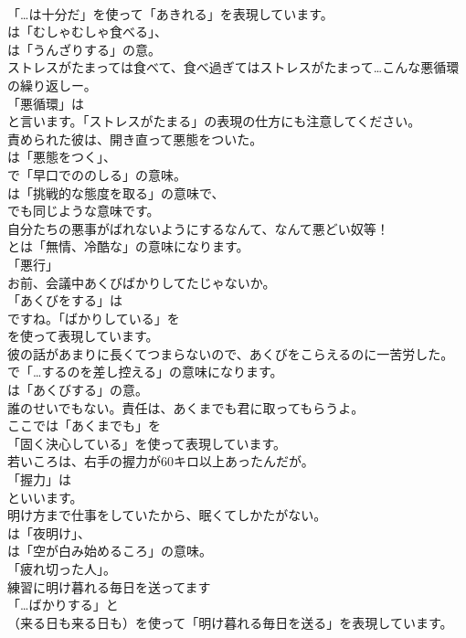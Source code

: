 \documentclass[8pt]{extreport}
\begin{document}
\begin{CJK}{UTF8}{min}
\\	「…は十分だ」を使って「あきれる」を表現しています。
\\	は「むしゃむしゃ食べる」、
\\	は「うんざりする」の意。	
\\	ストレスがたまっては食べて、食べ過ぎてはストレスがたまって…こんな悪循環の繰り返しー。 
\\	「悪循環」は
\\	と言います。「ストレスがたまる」の表現の仕方にも注意してください。	
\\	責められた彼は、開き直って悪態をついた。 
\\	は「悪態をつく」、
\\	で「早口でののしる」の意味。
\\	は「挑戦的な態度を取る」の意味で、
\\	でも同じような意味です。	
\\	自分たちの悪事がばれないようにするなんて、なんて悪どい奴等！ 
\\	とは「無情、冷酷な」の意味になります。
\\	「悪行」	
\\	お前、会議中あくびばかりしてたじゃないか。 
\\	「あくびをする」は
\\	ですね。「ばかりしている」を
\\	を使って表現しています。	
\\	彼の話があまりに長くてつまらないので、あくびをこらえるのに一苦労した。 
\\	で「…するのを差し控える」の意味になります。
\\	は「あくびする」の意。	
\\	誰のせいでもない。責任は、あくまでも君に取ってもらうよ。 
\\	ここでは「あくまでも」を
\\	「固く決心している」を使って表現しています。	
\\	若いころは、右手の握力が60キロ以上あったんだが。 
\\	「握力」は 
\\	といいます。	
\\	明け方まで仕事をしていたから、眠くてしかたがない。 
\\	は「夜明け」、
\\	は「空が白み始めるころ」の意味。
\\	「疲れ切った人」。	
\\	練習に明け暮れる毎日を送ってます 
\\	「…ばかりする」と
\\	（来る日も来る日も）を使って「明け暮れる毎日を送る」を表現しています。	

\end{CJK}
\end{document}
